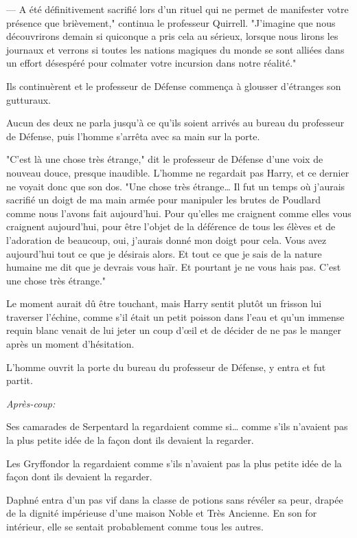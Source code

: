 --- A été définitivement sacrifié lors d'un rituel qui ne permet de manifester votre présence que brièvement," continua le professeur Quirrell. "J'imagine que nous découvrirons demain si quiconque a pris cela au sérieux, lorsque nous lirons les journaux et verrons si toutes les nations magiques du monde se sont alliées dans un effort désespéré pour colmater votre incursion dans notre réalité."

Ils continuèrent et le professeur de Défense commença à glousser d'étranges son gutturaux.

Aucun des deux ne parla jusqu'à ce qu'ils soient arrivés au bureau du professeur de Défense, puis l'homme s'arrêta avec sa main sur la porte.

"C'est là une chose très étrange," dit le professeur de Défense d'une voix de nouveau douce, presque inaudible. L'homme ne regardait pas Harry, et ce dernier ne voyait donc que son dos. "Une chose très étrange… Il fut un temps où j'aurais sacrifié un doigt de ma main armée pour manipuler les brutes de Poudlard comme nous l'avons fait aujourd'hui. Pour qu'elles me craignent comme elles vous craignent aujourd'hui, pour être l'objet de la déférence de tous les élèves et de l'adoration de beaucoup, oui, j'aurais donné mon doigt pour cela. Vous avez aujourd'hui tout ce que je désirais alors. Et tout ce que je sais de la nature humaine me dit que je devrais vous haïr. Et pourtant je ne vous hais pas. C'est une chose très étrange."

Le moment aurait dû être touchant, mais Harry sentit plutôt un frisson lui traverser l'échine, comme s'il était un petit poisson dans l'eau et qu'un immense requin blanc venait de lui jeter un coup d'œil et de décider de ne pas le manger après un moment d'hésitation.

L'homme ouvrit la porte du bureau du professeur de Défense, y entra et fut partit.

\later

\emph{Après-coup:}

Ses camarades de Serpentard la regardaient comme si… comme s'ils n'avaient pas la plus petite idée de la façon dont ils devaient la regarder.

Les Gryffondor la regardaient comme s'ils n'avaient pas la plus petite idée de la façon dont ils devaient la regarder.

Daphné entra d'un pas vif dans la classe de potions sans révéler sa peur, drapée de la dignité impérieuse d'une maison Noble et Très Ancienne. En son for intérieur, elle se sentait probablement comme tous les autres.

